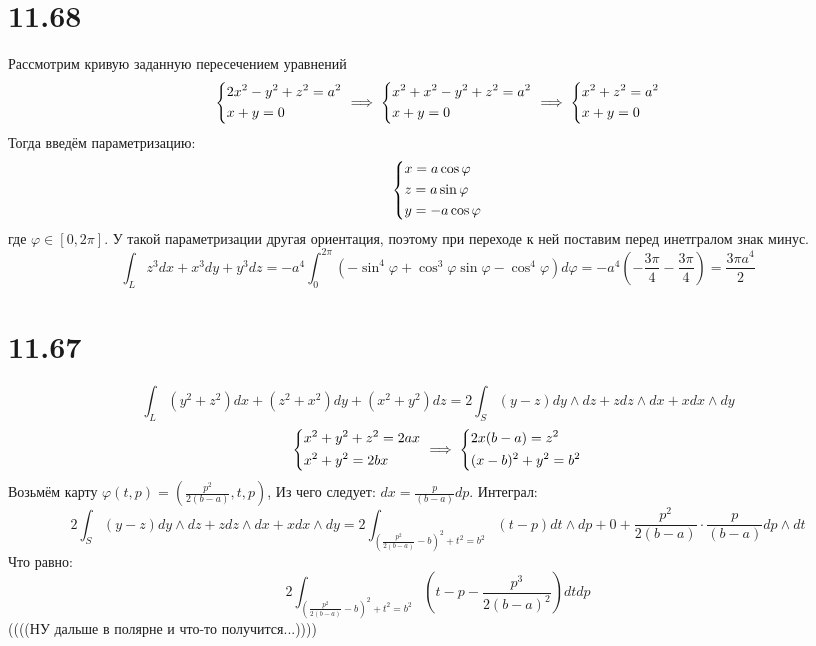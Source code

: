 \documentclass[12pt]{article}
\begin{document}
\section{11.68}
Рассмотрим кривую заданную пересечением уравнений 
\[
    \begin{dcases}
        2x^2 - y^2 + z^2 = a^2 \\ 
        x + y = 0
    \end{dcases} \implies 
    \begin{dcases}
        x^2 + x^2 - y^2 + z^2 = a^2 \\ 
        x + y = 0
    \end{dcases} \implies 
    \begin{dcases}
        x^2 + z^2 = a^2 \\ 
        x + y = 0
    \end{dcases}
\]
Тогда введём параметризацию: 
\[
    \begin{dcases}
        x = a \cos \varphi \\
        z = a \sin \varphi \\
        y = - a \cos \varphi
    \end{dcases}
\]
где $\varphi \in [0, 2\pi]$. У такой параметризации другая ориентация, поэтому 
при переходе к ней поставим перед инетгралом знак минус.
\[
    \int_{L} z^3 dx + x^3 dy + y^3 dz = 
    -a^4 \int_{0}^{2\pi} (-\sin^4 \varphi + \cos^3 \varphi \sin \varphi - \cos^4 \varphi) d \varphi = 
    -a^4 \left( - \frac{3\pi}{4} - \frac{3\pi}{4}  \right) = 
    \frac{3\pi a^4}{2}
\]

\section{11.67}
\[
    \int_{L} (y^2 + z^2)dx + (z^2 + x^2)dy + (x^2 + y^2) dz = 
    2 \int_{S} (y - z) dy \wedge dz + z dz \wedge dx + x dx \wedge dy
\]
\[
    \begin{dcases}
        x^2 + y^2 + z^2 = 2ax \\
        x^2 + y^2 = 2bx
    \end{dcases} \implies 
    \begin{dcases}
        2x(b - a) = z^2 \\
        (x - b)^2 + y^2 = b^2
    \end{dcases}
\]
Возьмём карту $\varphi(t, p) = (\frac{p^2}{2(b - a)}, t, p)$, 
Из чего следует: $dx = \frac{p}{(b - a)} dp$.
Интеграл: 
\[
    2 \int_{S} (y - z) dy \wedge dz + z dz \wedge dx + x dx \wedge dy = 
    2 \int_{\left( \frac{p^2}{2(b - a)} - b \right)^2 + t^2 = b^2 } (t - p) dt \wedge dp + 0 + \frac{p^2}{2(b - a)} \cdot \frac{p}{(b - a)} dp \wedge dt
\]
Что равно: 
\[
    2 \int_{\left( \frac{p^2}{2(b - a)} - b \right)^2 + t^2 = b^2 } \left( t - p - \frac{p^3}{2(b - a)^2} \right)  dt dp
\]
((((НУ дальше в полярне и что-то получится...))))
\end{document}
